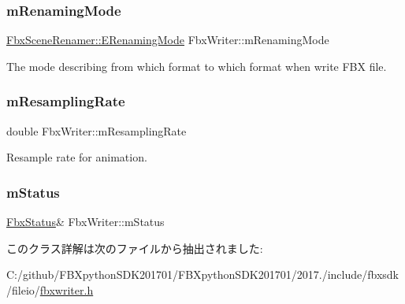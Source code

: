 \mbox{\label{class_fbx_writer_a473140b1c3e8af555f5e51ff883420eb}} 
\subsubsection{\texorpdfstring{m\+Renaming\+Mode}{mRenamingMode}}
{\footnotesize\ttfamily \hyperlink{class_fbx_scene_renamer_a9279ee1a645d6499b934adbc376f8678}{Fbx\+Scene\+Renamer\+::\+E\+Renaming\+Mode} Fbx\+Writer\+::m\+Renaming\+Mode\hspace{0.3cm}{\ttfamily [protected]}}



The mode describing from which format to which format when write F\+BX file. 

\mbox{\label{class_fbx_writer_a9fac62b1b3e302d2c690cea379df3d33}} 
\subsubsection{\texorpdfstring{m\+Resampling\+Rate}{mResamplingRate}}
{\footnotesize\ttfamily double Fbx\+Writer\+::m\+Resampling\+Rate\hspace{0.3cm}{\ttfamily [protected]}}



Resample rate for animation. 

\mbox{\label{class_fbx_writer_a57ea7c7d264738b21442e7abb19c4e14}} 
\subsubsection{\texorpdfstring{m\+Status}{mStatus}}
{\footnotesize\ttfamily \hyperlink{class_fbx_status}{Fbx\+Status}\& Fbx\+Writer\+::m\+Status\hspace{0.3cm}{\ttfamily [protected]}}



このクラス詳解は次のファイルから抽出されました\+:\begin{DoxyCompactItemize}
\item 
C\+:/github/\+F\+B\+Xpython\+S\+D\+K201701/\+F\+B\+Xpython\+S\+D\+K201701/2017./include/fbxsdk/fileio/\hyperlink{fbxwriter_8h}{fbxwriter.\+h}\end{DoxyCompactItemize}
